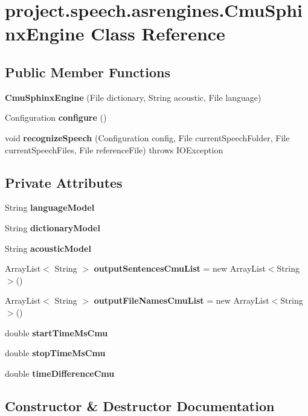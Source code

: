 \section{project.\+speech.\+asrengines.\+Cmu\+Sphinx\+Engine Class Reference}
\label{classproject_1_1speech_1_1asrengines_1_1_cmu_sphinx_engine}
\subsection*{Public Member Functions}
\begin{DoxyCompactItemize}
\item 
{\bf Cmu\+Sphinx\+Engine} (File dictionary, String acoustic, File language)
\item 
Configuration {\bf configure} ()
\item 
void {\bf recognize\+Speech} (Configuration config, File current\+Speech\+Folder, File current\+Speech\+Files, File reference\+File)  throws I\+O\+Exception 
\end{DoxyCompactItemize}
\subsection*{Private Attributes}
\begin{DoxyCompactItemize}
\item 
String {\bf language\+Model}
\item 
String {\bf dictionary\+Model}
\item 
String {\bf acoustic\+Model}
\item 
Array\+List$<$ String $>$ {\bf output\+Sentences\+Cmu\+List} = new Array\+List$<$String$>$()
\item 
Array\+List$<$ String $>$ {\bf output\+File\+Names\+Cmu\+List} = new Array\+List$<$String$>$()
\item 
double {\bf start\+Time\+Ms\+Cmu}
\item 
double {\bf stop\+Time\+Ms\+Cmu}
\item 
double {\bf time\+Difference\+Cmu}
\end{DoxyCompactItemize}


\subsection{Constructor \& Destructor Documentation}
